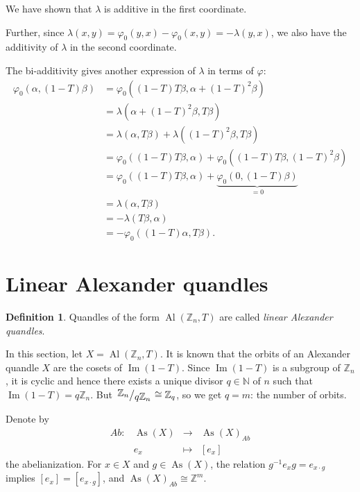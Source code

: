 \documentclass[a4paper,11pt]{amsart}
\theoremstyle{definition}
\newtheorem{definition}[thm]{Definition}
\newcommand{\N}{{\mathbb N}}
\newcommand{\Z}{{\mathbb Z}}
\DeclareMathOperator{\im}{Im}
\DeclareMathOperator{\Al}{Al}
\DeclareMathOperator{\As}{As}
\newcommand{\znz}[1]{\Z_{#1}}
\begin{document}
We have shown that $\lambda$ is additive in the first coordinate.

Further, since $\lambda(x,y) = \varphi_0(y,x) -\varphi_0(x,y) = -\lambda(y,x)$, we also have the additivity of $\lambda$ in the second coordinate.

The bi-additivity gives another expression of $\lambda$ in terms of $\varphi$:
\begin{align*}
\varphi_0(\alpha, (1-T) \beta) & = \varphi_0((1-T) T \beta, \alpha + (1-T)^2 \beta) \\
& = \lambda(\alpha + (1-T)^2 \beta, T \beta) \\
& = \lambda(\alpha, T\beta) + \lambda((1-T)^2\beta, T\beta) \\
& = \varphi_0( (1-T) T\beta, \alpha) + \varphi_0( (1-T)T\beta, (1-T)^2\beta) \\
& = \varphi_0( (1-T) T\beta, \alpha) + \underbrace{\varphi_0(0, (1-T)\beta )}_{=0} \\
& = \lambda(\alpha, T\beta)\\
& = -\lambda(T\beta, \alpha)\\
& = -\varphi_0((1-T)\alpha, T\beta).
\end{align*}

\section{Linear Alexander quandles}\label{sec:4}
\begin{definition}
Quandles of the form $\Al(\znz{n}, T)$ are called \emph{linear Alexander quandles}.
\end{definition}

In this section, let $X = \Al(\znz{n}, T)$.
It is known that the orbits of an Alexander quandle $X$ are the cosets of $\im(1-T)$.
Since $\im(1-T)$ is a subgroup of $\znz{n}$, it is cyclic and hence there exists a unique divisor $q\in \N$ of $n$ such that $\im(1-T) = q\znz{n}$.
But $\left.\raisebox{.2em}{$\znz{n}$}\middle/\raisebox{-.2em}{$q \znz{n}$}\right. \cong \znz{q}$, so we get $q = m$: the number of orbits.

Denote by 
\[
\begin{array}{cccc}
Ab:&\As(X) &\to & \As(X)_{Ab} \\
& e_x & \mapsto & [e_x]
\end{array}
\]
the abelianization.
For $x\in X$ and $g\in \As(X)$, the relation $g^{-1} e_x g = e_{x \cdot g}$ implies $[e_x] = [e_{x\cdot g}]$, and $\As(X)_{Ab} \cong \Z^m$.
\end{document}

